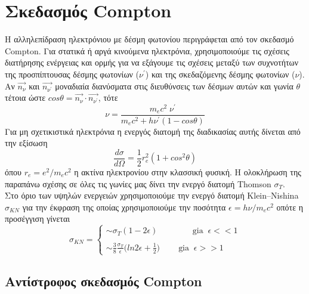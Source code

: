 \section{Σκεδασμός \textlatin{Compton}}

Η αλληλεπίδραση ηλεκτρόνιου με δέσμη φωτονίου περιγράφεται από τον σκεδασμό \textlatin{Compton}. Για στατικά ή αργά κινούμενα ηλεκτρόνια, χρησιμοποιούμε τις σχέσεις διατήρησης ενέργειας και ορμής για να εξάγουμε τις σχέσεις μεταξύ των συχνοτήτων της προσπίπτουσας δέσμης φωτονίων ($\nu^\prime$) και της σκεδαζόμενης δέσμης φωτονίων ($\nu$). Αν $\vec{n_\nu}$ και $\vec{n_{\nu^\prime}}$ μοναδιαία διανύσματα στις διευθύνσεις των δέσμων αυτών και γωνία $\theta$ τέτοια ώστε $cos \theta = \vec{n_\nu} \cdot \vec{n_{\nu^\prime}} $, τότε\cite{netzer_2013}
\begin{equation}
    \nu =\dfrac{ m_e c^2\; \nu^\prime }  { m_e c^2+ h \nu^\prime(1-cos\theta) } \label{eq:ComptonWavelength} 
\end{equation}
Για μη σχετικιστικά ηλεκτρόνια η ενεργός διατομή της διαδικασίας αυτής δίνεται από την εξίσωση\cite{netzer_2013}
\begin{equation}
    \frac{d\sigma}{d\Omega} =\frac{1}{2}  r_e^2 (1+cos^2 \theta)
\end{equation}
όπου $r_e = e^2/m_e c^2$ η ακτίνα ηλεκτρονίου στην κλασσική φυσική. Η ολοκλήρωση της παραπάνω σχέσης σε όλες τις γωνίες μας δίνει την ενεργό διατομή \textlatin{Thomson} $\sigma_T$.\\
Στο όριο των υψηλών ενεργειών χρησιμοποιούμε την ενεργό διατομή \textlatin{Klein–Nishina} $\sigma_{KN}$ για την έκφραση της οποίας χρησιμοποιούμε την ποσότητα $\epsilon = h\nu/m_e c^2$ οπότε η προσέγγιση γίνεται\cite{netzer_2013} 
\begin{equation}
    \sigma_{KN} =\begin{cases} \sim \sigma_T (1-2\epsilon)\;\;\;\;\;\;\;\; \;\;\;\;\;\;\; \mbox{gia}\;\; \epsilon<<1 
    \\ \;\\ 
    \sim \frac{3}{8}\frac{\sigma_T}{\epsilon} \Big(ln2\epsilon +\frac{1}{2} \Big) \;\;\;\;\;\;\;\; \mbox{gia}\;\; \epsilon>>1 \end{cases}
\end{equation}

\subsection*{Αντίστροφος σκεδασμός \textlatin{Compton}}

